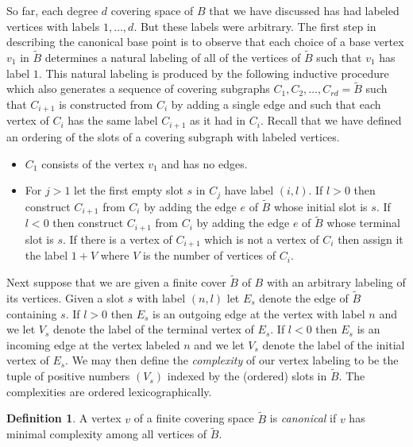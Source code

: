 \documentclass[12pt]{article}
\theoremstyle{definition}
\newtheorem{definition}{Definition}
\renewcommand{\tilde}{\widetilde}
\begin{document}
   So far, each degree $d$ covering space of $B$ that we have discussed has had
   labeled vertices with labels $1, \ldots, d$.  But these labels were
   arbitrary.  The first step in describing the canonical base point is to
   observe that each choice of a base vertex $v_1$ in $\tilde B$ determines a
   natural labeling of all of the vertices of $\tilde B$ such that $v_1$ has
   label $1$.  This natural labeling is produced by the following inductive
   procedure which also generates a sequence of covering subgraphs
   $C_1, C_2, \ldots, C_{rd} = \tilde B$ such that $C_{i+1}$ is constructed from
   $C_i$ by adding a single edge and such that each vertex of $C_i$ has the same
   label $C_{i+1}$ as it had in $C_i$. Recall that we have defined an ordering
   of the slots of a covering subgraph with labeled vertices.
   \begin{itemize}
   \item $C_1$ consists of the vertex $v_1$ and has no edges.
   \item For $j > 1$ let the first empty slot $s$ in $C_j$ have label $(i, l)$.
     If $l > 0$ then construct $C_{i+1}$ from $C_i$ by adding the edge $e$
     of $\tilde B$ whose initial slot is $s$.  If $l < 0$ then construct
     $C_{i+1}$ from $C_i$ by adding the edge $e$ of $\tilde B$ whose terminal
     slot is $s$.  If there is a vertex of $C_{i+1}$ which is not a vertex of $C_i$ then
     assign it the label $1 + V$ where $V$ is the number of vertices of $C_i$.
   \end{itemize}

   Next suppose that we are given a finite cover $\tilde B$ of $B$ with an
   arbitrary labeling of its vertices.  Given a slot $s$ with label $(n, l)$ let
   $E_s$ denote the edge of $\tilde B$ containing $s$.  If $l > 0$ then $E_s$ is an
   outgoing edge at the vertex with label $n$ and we let $V_s$ denote the
   label of the terminal vertex of $E_s$.  If $l < 0$ then $E_s$ is an incoming
   edge at the vertex labeled $n$ and we let $V_s$ denote the label of the
   initial vertex of $E_s$.  We may then define the {\it complexity} of our
   vertex labeling to be the tuple of positive numbers $(V_s)$ indexed by the
   (ordered) slots in $\tilde B$.  The complexities are ordered
   lexicographically.

   \begin{definition}
     A vertex $v$ of a finite covering space $\tilde B$ is {\it canonical} if
     $v$ has minimal complexity among all vertices of $\tilde B$.
   \end{definition}
\end{document}
